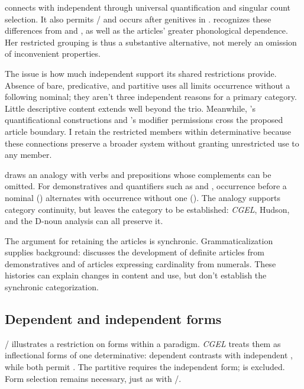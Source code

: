 \documentclass[12pt]{article}
\begin{document}
 connects with independent  through universal quantification and singular count selection. It also permits / and occurs after genitives in . \textcite[156--158]{spinillo2004reconceptualising} recognizes these differences from  and , as well as the articles' greater phonological dependence. Her restricted grouping is thus a substantive alternative, not merely an omission of inconvenient properties.

The issue is how much independent support its shared restrictions provide. Absence of bare, predicative, and partitive uses all limits occurrence without a following nominal; they aren't three independent reasons for a primary category. Little descriptive content extends well beyond the trio. Meanwhile, 's quantificational constructions and 's modifier permissions cross the proposed article boundary. I retain the restricted members within determinative because these connections preserve a broader system without granting unrestricted use to any member.

\textcite[140--144]{spinillo2004reconceptualising} draws an analogy with verbs and prepositions whose complements can be omitted. For demonstratives and quantifiers such as  and , occurrence before a nominal () alternates with occurrence without one (). The analogy supports category continuity, but leaves the category to be established: \textit{CGEL}, Hudson, and the D-noun analysis can all preserve it.

The argument for retaining the articles is synchronic. Grammaticalization supplies background: \textcite[331--336]{lyons1999} discusses the development of definite articles from demonstratives and of articles expressing cardinality from numerals. These histories can explain changes in content and use, but don't establish the synchronic categorization.

\subsection{Dependent and independent forms}\label{sec:form-selection}

/ illustrates a restriction on forms within a paradigm. \textit{CGEL} treats them as inflectional forms of one determinative: dependent  contrasts with independent , while both permit  \citep[389--390]{huddleston2002}. The partitive  requires the independent form;  is excluded. Form selection remains necessary, just as with /.
\end{document}
